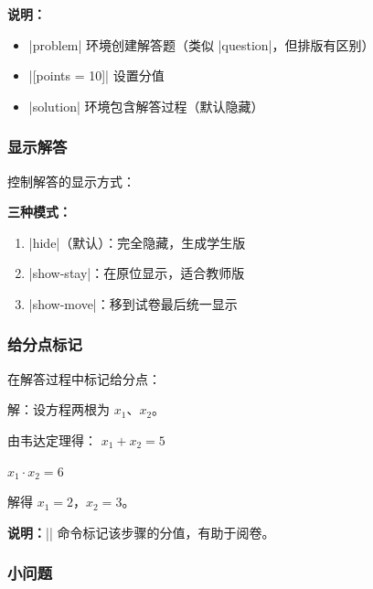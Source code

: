 \textbf{说明：}
\begin{itemize}
  \item |problem| 环境创建解答题（类似 |question|，但排版有区别）
  \item |[points = 10]| 设置分值
  \item |solution| 环境包含解答过程（默认隐藏）
\end{itemize}

\subsubsection{显示解答}

控制解答的显示方式：

\begin{latexcode}
\end{latexcode}

\textbf{三种模式：}
\begin{enumerate}
  \item |hide|（默认）：完全隐藏，生成学生版
  \item |show-stay|：在原位显示，适合教师版
  \item |show-move|：移到试卷最后统一显示
\end{enumerate}

\subsubsection{给分点标记}

在解答过程中标记给分点：

\begin{latexcode}
  \begin{solution}
    解：设方程两根为 $x_1$、$x_2$。

    由韦达定理得：
    $x_1 + x_2 = 5$ 

    $x_1 \cdot x_2 = 6$ 

    解得 $x_1 = 2$，$x_2 = 3$。
  \end{solution}
\end{latexcode}

\textbf{说明：}|| 命令标记该步骤的分值，有助于阅卷。

\subsubsection{小问题}

